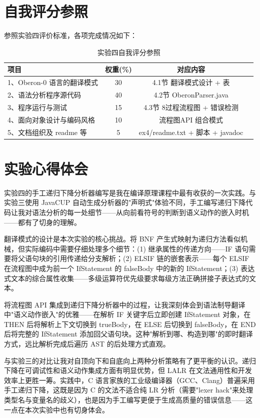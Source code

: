 \section{自我评分参照}

参照实验四评价标准，各项完成情况如下：

\begin{table}[htbp]
    \centering
    \begin{tabular}{|p{4.5cm}|c|c|p{4.5cm}|}
    \hline
    \textbf{项目} & \textbf{权重(\%)} & \textbf{对应内容} \\
    \hline
    1、Oberon-0 语言的翻译模式 & 30  & 4.1节 翻译模式设计 + 表 \\
    2、语法分析程序源代码 & 40  & 4.2节 OberonParser.java \\
    3、程序运行与测试 & 15  & 4.3节 8过程流程图 + 错误检测 \\
    4、面向对象设计与编码风格 & 10  & 流程图API 组合模式 \\
    5、文档组织及 readme 等 & 5  & ex4/readme.txt + 脚本 + javadoc \\
    \hline
    \end{tabular}
    \caption{实验四自我评分参照}
    \label{tab:self-eval-ex4}
\end{table}

\section{实验心得体会}

实验四的手工递归下降分析器编写是我在编译原理课程中最有收获的一次实践。与实验三使用 JavaCUP 自动生成分析器的"声明式"体验不同，手工编写递归下降代码让我对语法分析的每一处细节——从向前看符号的判断到语义动作的嵌入时机——都有了切身的理解。

翻译模式的设计是本次实验的核心挑战。将 BNF 产生式映射为递归方法看似机械，但实际编码中需要仔细处理多个细节：(1) 继承属性的传递方向——IF 语句需要将父语句块的引用传递给分支解析；(2) ELSIF 链的嵌套表示——每个 ELSIF 在流程图中成为前一个 IfStatement 的 falseBody 中的新的 IfStatement；(3) 表达式文本的综合属性收集——多级运算符优先级要求每级方法正确拼接子表达式的文本。

将流程图 API 集成到递归下降分析器中的过程，让我深刻体会到语法制导翻译中"语义动作嵌入"的优雅——在解析 IF 关键字后立即创建 IfStatement 对象，在 THEN 后将解析上下文切换到 trueBody，在 ELSE 后切换到 falseBody，在 END 后将完整的 IfStatement 添加回父语句块。这种"解析到哪、构造到哪"的即时翻译方式，远比解析完成后遍历 AST 的后处理方式直观。

与实验三的对比让我对自顶向下和自底向上两种分析策略有了更平衡的认识。递归下降在可调试性和语义动作集成方面有明显优势，但 LALR 在文法通用性和开发效率上更胜一筹。实践中，C 语言家族的工业级编译器（GCC、Clang）普遍采用手工递归下降，这既是因为 C 的文法不适合纯 LR 分析（需要"lexer hack"来处理类型名与变量名的歧义），也是因为手工编写更便于生成高质量的错误信息——这一点在本次实验中也有切身体会。
